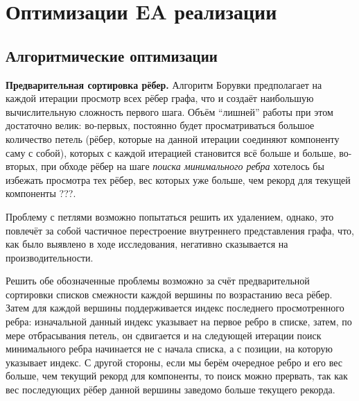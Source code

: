 \documentclass[a4paper,10pt]{extarticle}
\begin{document}



\newpage
\section{Оптимизации EA реализации}

\subsection{Алгоритмические оптимизации}

\textbf{Предварительная сортировка рёбер.}
Алгоритм Борувки предполагает на каждой итерации просмотр всех рёбер графа, что и создаёт наибольшую вычислительную сложность первого шага.
Объём ``лишней'' работы при этом достаточно велик: во-первых, постоянно будет просматриваться большое количество петель (рёбер, которые на данной итерации соединяют компоненту саму с собой), которых с каждой итерацией становится всё больше и больше, во-вторых, при обходе рёбер на шаге \textit{поиска минимального ребра} хотелось бы избежать просмотра тех рёбер, вес которых уже больше, чем рекорд для текущей компоненты ???.

Проблему с петлями возможно попытаться решить их удалением, однако, это повлечёт за собой частичное перестроение внутреннего представления графа, что, как было выявлено в ходе исследования, негативно сказывается на производительности.

Решить обе обозначенные проблемы возможно за счёт предварительной сортировки списков смежности каждой вершины по возрастанию веса рёбер. Затем для каждой вершины поддерживается индекс последнего просмотренного ребра: изначальной данный индекс указывает на первое ребро в списке, затем, по мере отбрасывания петель, он сдвигается и на следующей итерации поиск минимального ребра начинается не с начала списка, а с позиции, на которую указывает индекс. С другой стороны, если мы берём очередное ребро и его вес больше, чем текущий рекорд для компоненты, то поиск можно прервать, так как вес последующих рёбер данной вершины заведомо больше текущего рекорда.
\end{document}
